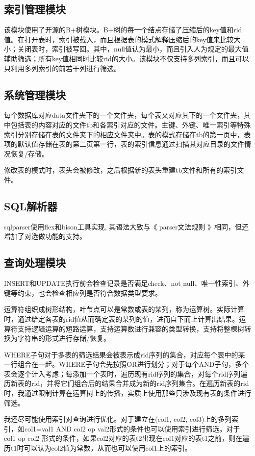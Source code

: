 \documentclass[11pt,UTF8]{report}
\begin{document}
	\subsection{索引管理模块}
	该模块使用了开源的B+树模块。B+树的每一个结点存储了压缩后的key值和rid值。在打开表时，索引被载入，而且根据表的模式解释压缩后的key值来比较大小；关闭表时，索引被写回。其中，null值认为最小，而且引入人为规定的最大值辅助筛选；所有key值相同时比较rid的大小。该模块不仅支持多列索引，而且可以只利用多列索引的前若干列进行筛选。
	
	\subsection{系统管理模块}
	每个数据库对应data文件夹下的一个文件夹，每个表又对应其下的一个文件夹，其中包括表的内容对应的文件tb和各索引对应的文件。主键、外键、唯一索引等特殊索引分别存储在表的文件夹下的相应文件夹中。表的模式存储在tb的第一页中，表项的默认值存储在表的第二页第一行，表的索引信息通过扫描其对应目录的文件情况恢复/存储。
	
	修改表的模式时，表头会被修改，之后根据新的表头重建tb文件和所有的索引文件。
	
	\subsection{SQL解析器}
	sqlparser使用flex和bison工具实现, 其语法大致与《 parser文法规则 》相同，但还增加了对选做功能的支持。 
	
	\subsection{查询处理模块}
	INSERT和UPDATE执行前会检查记录是否满足check、not null、唯一性索引、外键等约束，也会检查相应列是否符合数据类型要求。
	
	运算符组织成树形结构，叶节点可以是常数或表的某列，称为运算树。实际计算时，通过给定各表的rid值从而确定表的某列的值，进而自下而上计算出结果。运算符支持逻辑运算的短路运算，支持运算数进行兼容的类型转换，支持将整棵树转换为字符串的形式进行存储/恢复。
	
	WHERE子句对于多表的筛选结果会被表示成rid序列的集合，对应每个表中的某一行组合在一起。WHERE子句会先按照OR进行划分；对于每个AND子句，多个表会逐个计入考虑；每添加一个表时，遍历现有rid序列的集合，对每个rid序列遍历新表的rid，并将它们组合后的结果合并成为新的rid序列集合。在遍历新表的rid时，我通过限制计算在运算树上的传播，实质上使用那些只涉及现有表的条件进行筛选。
	
	我还尽可能使用索引对查询进行优化。对于建立在(col1, col2, col3)上的多列索引，如col1=val1 AND col2 op val2形式的条件也可以使用索引进行筛选。对于 col1 op col2 形式的条件，如果col2对应的表t2出现在col1对应的表t1之前，则在遍历t1时可以认为col2值为常数，从而也可以使用col1上的索引。
	
\end{document}

